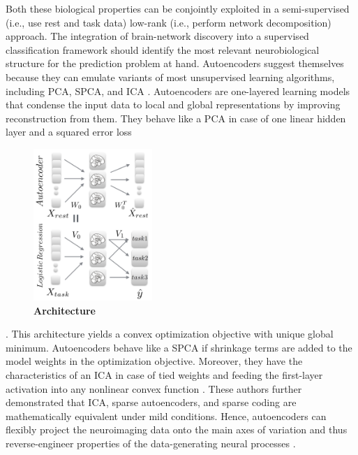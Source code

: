 \documentclass{article} %
\begin{document}
Both these biological properties can be conjointly exploited in a 
semi-supervised (i.e., use rest and task data)
low-rank (i.e., perform network decomposition)
approach.
%
The integration of brain-network discovery into a 
supervised classification framework should identify the most relevant
neurobiological structure for the prediction problem at hand.
%
Autoencoders suggest themselves because they can emulate
variants of most unsupervised learning algorithms,
including PCA, SPCA, and ICA \cite{hinton06}.
Autoencoders
are one-layered learning models that condense the input data to
local and global representations
by improving reconstruction from them.
%
They behave like a PCA
in case of one linear hidden layer and a squared error loss
%
\begin{figure}
  \centering
    \includegraphics[width=0.40\textwidth]{figures/figure1.png}
  \caption {\textbf{Architecture}
  }
\end{figure}
%
\cite{baldi1989neural}.
This architecture yields a convex optimization objective
with unique global minimum.
Autoencoders behave like a SPCA if shrinkage terms are added to the
model weights in the optimization objective.
Moreover, they have the characteristics of an ICA in case of tied weights
and feeding the first-layer activation into any nonlinear convex
function \cite{le2011ica}.
These authors further demonstrated that ICA, sparse autoencoders, and 
sparse coding are mathematically equivalent
under mild conditions.
Hence, autoencoders can flexibly project the neuroimaging data
onto the main axes of variation and thus
reverse-engineer properties of the data-generating
neural processes \cite{olshausen96}.
\end{document}
